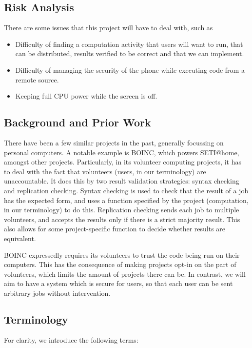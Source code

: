 \documentclass[a4paper,10pt]{article}
\begin{document}
\subsection{Risk Analysis}
There are some issues that this project will have to deal with, such as
\begin{itemize}
 \item Difficulty of finding a computation activity that users will want to run, that can be distributed, results verified to be correct and that we can implement.
 \item Difficulty of managing the security of the phone while executing code from a remote source.
 \item Keeping full CPU power while the screen is off.
\end{itemize}


\subsection{Background and Prior Work}
There have been a few similar projects in the past, generally focussing on personal computers. A notable example is BOINC, which powers SETI@home, amongst other projects. Particularly, in its volunteer computing projects, it has to deal with the fact that volunteers (users, in our terminology) are unaccountable. It does this by two result validation strategies: syntax checking and replication checking. Syntax checking is used to check that the result of a job has the expected form, and uses a function specified by the project (computation, in our terminology) to do this. Replication checking sends each job to multiple volunteers, and accepts the results only if there is a strict majority result. This also allows for some project-specific function to decide whether results are equivalent.

BOINC expressedly requires its volunteers to trust the code being run on their computers. This has the consequence of making projects opt-in on the part of volunteers, which limits the amount of projects there can be. In contrast, we will aim to have a system which is secure for users, so that each user can be sent arbitrary jobs without intervention.

\subsection{Terminology}
For clarity, we introduce the following terms:
\end{document}
